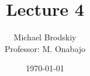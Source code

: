


\title{Lecture 4}
\date{\today}
\author{Michael Brodskiy\\ \small Professor: M. Onabajo}



\maketitle


